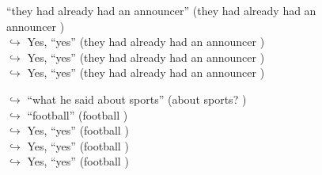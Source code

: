 \documentclass[11pt,a4paper, onecolumn]{article}
\begin{document}
\begin{figure}[t]
\begin{tcolorbox}[boxsep=0pt,left=5pt,right=0pt,top=2pt,colback = yellow!5]
\begin{dialogue}
{ ``they had already had an announcer'' (they had already had an announcer ) }
\\
\colorbox{pink!25}{$\hookrightarrow$}
\colorbox{red!25}{Yes,}
{ ``yes'' (they had already had an announcer ) }
\\
\colorbox{pink!25}{$\hookrightarrow$}
\colorbox{red!25}{Yes,}
{ ``yes'' (they had already had an announcer ) }
\\
\colorbox{pink!25}{$\hookrightarrow$}
\colorbox{red!25}{Yes,}
{ ``yes'' (they had already had an announcer ) }
\\
 \end{dialogue}\end{tcolorbox}\end{figure}\begin{figure}[t] \small \begin{tcolorbox}[boxsep=0pt,left=5pt,right=0pt,top=2pt,colback = yellow!5] \begin{dialogue}
 \small 
\colorbox{pink!25}{$\hookrightarrow$}
{ ``what he said about sports'' (about sports? ) }
\\
\colorbox{pink!25}{$\hookrightarrow$}
{ ``football'' (football ) }
\\
\colorbox{pink!25}{$\hookrightarrow$}
\colorbox{red!25}{Yes,}
{ ``yes'' (football ) }
\\
\colorbox{pink!25}{$\hookrightarrow$}
\colorbox{red!25}{Yes,}
{ ``yes'' (football ) }
\\
\colorbox{pink!25}{$\hookrightarrow$}
\colorbox{red!25}{Yes,}
{ ``yes'' (football ) }
\\
 \end{dialogue}\end{tcolorbox}\end{figure}
\end{document}
